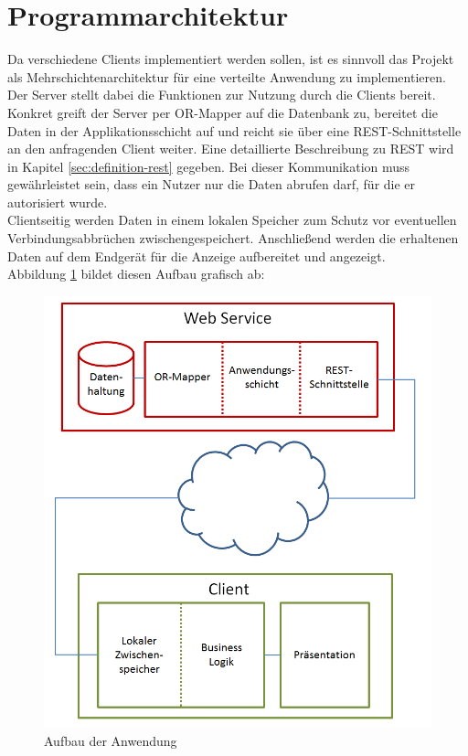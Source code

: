 \section{Programmarchitektur}
\label{sec:programmarchitektur}
Da verschiedene Clients implementiert werden sollen, ist es sinnvoll das Projekt als Mehrschichtenarchitektur für eine verteilte Anwendung zu implementieren. \\
Der Server stellt dabei die Funktionen zur Nutzung durch die Clients bereit. Konkret greift der Server per \gls{OR-Mapper} auf die Datenbank zu, bereitet die Daten in der Applikationsschicht auf und reicht sie über eine \ac{REST}-Schnittstelle an den anfragenden Client weiter. Eine detaillierte Beschreibung zu \ac{REST} wird in Kapitel \ref{sec:definition-rest} gegeben. Bei dieser Kommunikation muss gewährleistet sein, dass ein Nutzer nur die Daten abrufen darf, für die er autorisiert wurde. \\
Clientseitig werden Daten in einem lokalen Speicher zum Schutz vor eventuellen Verbindungsabbrüchen zwischengespeichert. Anschließend werden die erhaltenen Daten auf dem Endgerät für die Anzeige aufbereitet und angezeigt. \\
Abbildung \ref{pic:architecture} bildet diesen Aufbau grafisch ab:
\begin{figure}[h]
\centering
\includegraphics[width=0.7\linewidth]{content/images/Aufbau-Architektur.png}
\caption{Aufbau der Anwendung}
\label{pic:architecture}
\end{figure}

\newpage
